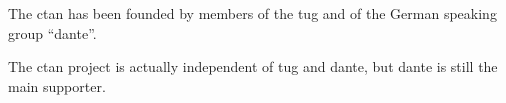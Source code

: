 \documentclass[parskip=half]{scrartcl}
\begin{document}
The \gls{ctan} has been founded by members of the \gls{tug} and of
the German speaking group ``\gls{dante}''.

The \gls{ctan} project is actually independent of \gls{tug} and \gls{dante},
but \gls{dante} is still the main supporter.
\printnoidxglossary[type=\acronymtype]
\end{document}

